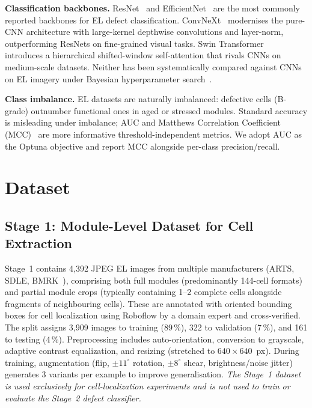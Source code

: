 \documentclass[conference]{IEEEtran}
\begin{document}
\textbf{Classification backbones.} ResNet~\cite{he2016} and EfficientNet~\cite{tan2019} are the most commonly reported backbones for EL defect classification. ConvNeXt~\cite{liu2022} modernises the pure-CNN architecture with large-kernel depthwise convolutions and layer-norm, outperforming ResNets on fine-grained visual tasks. Swin Transformer~\cite{liu2021} introduces a hierarchical shifted-window self-attention that rivals CNNs on medium-scale datasets. Neither has been systematically compared against CNNs on EL imagery under Bayesian hyperparameter search~\cite{akiba2019}.

\textbf{Class imbalance.} EL datasets are naturally imbalanced: defective cells (B-grade) outnumber functional ones in aged or stressed modules. Standard accuracy is misleading under imbalance; AUC and Matthews Correlation Coefficient (MCC)~\cite{deitsch2019} are more informative threshold-independent metrics. We adopt AUC as the Optuna objective and report MCC alongside per-class precision/recall.

\section{Dataset}
\label{sec:dataset}

\subsection{Stage 1: Module-Level Dataset for Cell Extraction}
Stage~1 contains 4{,}392 JPEG EL images from multiple manufacturers (ARTS, SDLE, BMRK~\cite{pratt2023benchmark}), comprising both full modules (predominantly 144-cell formats) and partial module crops (typically containing 1--2 complete cells alongside fragments of neighbouring cells). These are annotated with oriented bounding boxes for cell localization using Roboflow by a domain expert and cross-verified. The split assigns 3{,}909 images to training (89\,\%), 322 to validation (7\,\%), and 161 to testing (4\,\%). Preprocessing includes auto-orientation, conversion to grayscale, adaptive contrast equalization, and resizing (stretched to $640\times640$~px). During training, augmentation (flip, $\pm11^\circ$ rotation, $\pm8^\circ$ shear, brightness/noise jitter) generates 3 variants per example to improve generalisation. \textit{The Stage~1 dataset is used exclusively for cell-localization experiments and is not used to train or evaluate the Stage~2 defect classifier.}
\end{document}
